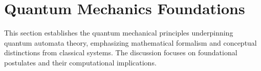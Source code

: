 \section{Quantum Mechanics Foundations}
\label{sec:quantum-foundations}

This section establishes the quantum mechanical principles underpinning quantum automata theory, emphasizing mathematical formalism and conceptual distinctions from classical systems. The discussion focuses on foundational postulates and their computational implications.





 